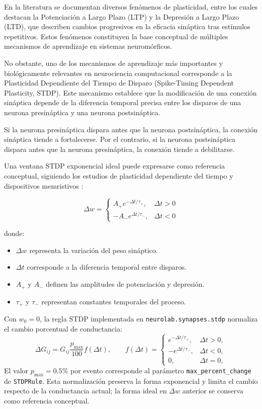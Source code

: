 En la literatura se documentan diversos fenómenos de plasticidad, entre los cuales destacan la Potenciación a Largo Plazo (LTP) y la Depresión a Largo Plazo (LTD), que describen cambios progresivos en la eficacia sináptica tras estímulos repetitivos. Estos fenómenos constituyen la base conceptual de múltiples mecanismos de aprendizaje en sistemas neuromórficos.

No obstante, uno de los mecanismos de aprendizaje más importantes y biológicamente relevantes en neurociencia computacional corresponde a la Plasticidad Dependiente del Tiempo de Disparo (Spike-Timing Dependent Plasticity, STDP). Este mecanismo establece que la modificación de una conexión sináptica depende de la diferencia temporal precisa entre los disparos de una neurona presináptica y una neurona postsináptica.

Si la neurona presináptica dispara antes que la neurona postsináptica, la conexión sináptica tiende a fortalecerse. Por el contrario, si la neurona postsináptica dispara antes que la neurona presináptica, la conexión tiende a debilitarse.

Una ventana STDP exponencial ideal puede expresarse como referencia
conceptual, siguiendo los estudios de plasticidad dependiente del
tiempo y dispositivos memristivos \cite{33,30}:

\begin{equation}
\Delta w =
\begin{cases}
A_{+}e^{-\Delta t/\tau_{+}}, & \Delta t > 0 \\
-A_{-}e^{\Delta t/\tau_{-}}, & \Delta t < 0
\end{cases}
\end{equation}

donde:

\begin{itemize}
\item $\Delta w$ representa la variación del peso sináptico.
\item $\Delta t$ corresponde a la diferencia temporal entre disparos.
\item $A_{+}$ y $A_{-}$ definen las amplitudes de potenciación y depresión.
\item $\tau_{+}$ y $\tau_{-}$ representan constantes temporales del proceso.
\end{itemize}

Con $w_0=0$, la regla STDP implementada en
\texttt{neurolab.synapses.stdp} normaliza el cambio porcentual de
conductancia:
\begin{equation}
\Delta G_{ij}
=G_{ij}\frac{p_{\max}}{100}f(\Delta t), \qquad
f(\Delta t)=
\begin{cases}
e^{-\Delta t/\tau_{+}}, & \Delta t>0,\\
-e^{\Delta t/\tau_{-}}, & \Delta t<0,\\
0, & \Delta t=0,
\end{cases}
\end{equation}
El valor $p_{\max}=0.5\%$ por evento corresponde al parámetro
\texttt{max\_percent\_change} de \texttt{STDPRule}.
Esta normalización preserva la forma exponencial y limita el cambio
respecto de la conductancia actual; la forma ideal en $\Delta w$
anterior se conserva como referencia conceptual.

